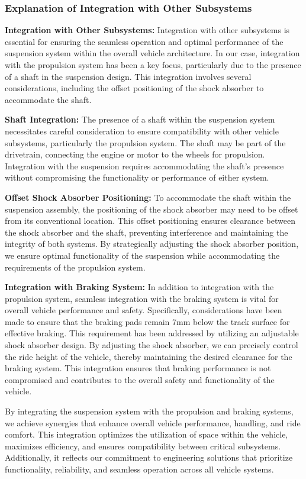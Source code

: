 \subsubsection{Explanation of Integration with Other Subsystems}
\textbf{Integration with Other Subsystems:} Integration with other subsystems is essential for ensuring the seamless operation and optimal performance of the suspension system within the overall vehicle architecture. In our case, integration with the propulsion system has been a key focus, particularly due to the presence of a shaft in the suspension design. This integration involves several considerations, including the offset positioning of the shock absorber to accommodate the shaft.

\textbf{Shaft Integration:} The presence of a shaft within the suspension system necessitates careful consideration to ensure compatibility with other vehicle subsystems, particularly the propulsion system. The shaft may be part of the drivetrain, connecting the engine or motor to the wheels for propulsion. Integration with the suspension requires accommodating the shaft's presence without compromising the functionality or performance of either system.

\textbf{Offset Shock Absorber Positioning:} To accommodate the shaft within the suspension assembly, the positioning of the shock absorber may need to be offset from its conventional location. This offset positioning ensures clearance between the shock absorber and the shaft, preventing interference and maintaining the integrity of both systems. By strategically adjusting the shock absorber position, we ensure optimal functionality of the suspension while accommodating the requirements of the propulsion system.

\textbf{Integration with Braking System:} In addition to integration with the propulsion system, seamless integration with the braking system is vital for overall vehicle performance and safety. Specifically, considerations have been made to ensure that the braking pads remain 7mm below the track surface for effective braking. This requirement has been addressed by utilizing an adjustable shock absorber design. By adjusting the shock absorber, we can precisely control the ride height of the vehicle, thereby maintaining the desired clearance for the braking system. This integration ensures that braking performance is not compromised and contributes to the overall safety and functionality of the vehicle.

By integrating the suspension system with the propulsion and braking systems, we achieve synergies that enhance overall vehicle performance, handling, and ride comfort. This integration optimizes the utilization of space within the vehicle, maximizes efficiency, and ensures compatibility between critical subsystems. Additionally, it reflects our commitment to engineering solutions that prioritize functionality, reliability, and seamless operation across all vehicle systems.

